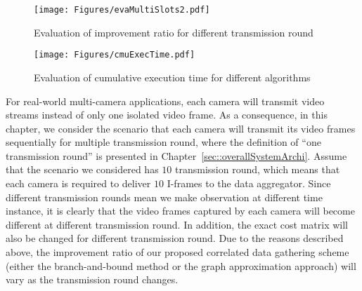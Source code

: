 %
\begin{figure}
\begin{center}
\texttt{[image: Figures/evaMultiSlots2.pdf]}
\caption{\label{fig::evaMultiSlots}Evaluation of improvement ratio for different transmission round}
\end{center}
\end{figure}
%
\begin{figure}
\begin{center}
\texttt{[image: Figures/cmuExecTime.pdf]}
\caption{\label{fig::evaExecTime}Evaluation of cumulative execution time for different algorithms}
\end{center}
\end{figure}
%
For real-world multi-camera applications, each camera will transmit video streams instead of only one isolated video frame.
As a consequence, in this chapter, we consider the scenario that each camera will transmit its video frames sequentially for multiple transmission round, where the definition of ``one transmission round'' is presented in Chapter~\ref{sec::overallSystemArchi}.
Assume that the scenario we considered has $10$ transmission round, which means that each camera is required to deliver $10$ I-frames to the data aggregator.
Since different transmission rounds mean we make observation at different time instance, it is clearly that the video frames captured by each camera will become different at different transmission round.
In addition, the exact cost matrix will also be changed for different transmission round.
Due to the reasons described above, the improvement ratio of our proposed correlated data gathering scheme (either the branch-and-bound method or the graph approximation approach) will vary as the transmission round changes.

